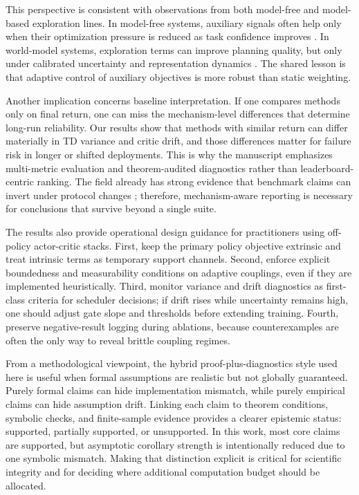 \documentclass{article} %
\begin{document}
This perspective is consistent with observations from both model-free and model-based exploration lines. In model-free systems, auxiliary signals often help only when their optimization pressure is reduced as task confidence improves \citep{arxiv1705_05363, arxiv1810_12894, arxiv2002_06038}. In world-model systems, exploration terms can improve planning quality, but only under calibrated uncertainty and representation dynamics \citep{arxiv2005_05960, arxiv2301_04104, arxiv2310_16828}. The shared lesson is that adaptive control of auxiliary objectives is more robust than static weighting.

Another implication concerns baseline interpretation. If one compares methods only on final return, one can miss the mechanism-level differences that determine long-run reliability. Our results show that methods with similar return can differ materially in TD variance and critic drift, and those differences matter for failure risk in longer or shifted deployments. This is why the manuscript emphasizes multi-metric evaluation and theorem-audited diagnostics rather than leaderboard-centric ranking. The field already has strong evidence that benchmark claims can invert under protocol changes \citep{arxiv1912_01588, arxiv2004_07219, arxiv2405_19548}; therefore, mechanism-aware reporting is necessary for conclusions that survive beyond a single suite.

The results also provide operational design guidance for practitioners using off-policy actor-critic stacks. First, keep the primary policy objective extrinsic and treat intrinsic terms as temporary support channels. Second, enforce explicit boundedness and measurability conditions on adaptive couplings, even if they are implemented heuristically. Third, monitor variance and drift diagnostics as first-class criteria for scheduler decisions; if drift rises while uncertainty remains high, one should adjust gate slope and thresholds before extending training. Fourth, preserve negative-result logging during ablations, because counterexamples are often the only way to reveal brittle coupling regimes.

From a methodological viewpoint, the hybrid proof-plus-diagnostics style used here is useful when formal assumptions are realistic but not globally guaranteed. Purely formal claims can hide implementation mismatch, while purely empirical claims can hide assumption drift. Linking each claim to theorem conditions, symbolic checks, and finite-sample evidence provides a clearer epistemic status: supported, partially supported, or unsupported. In this work, most core claims are supported, but asymptotic corollary strength is intentionally reduced due to one symbolic mismatch. Making that distinction explicit is critical for scientific integrity and for deciding where additional computation budget should be allocated.
\end{document}
